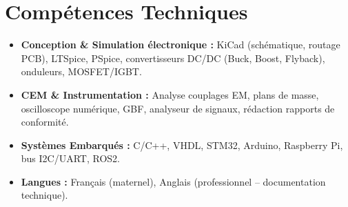 \documentclass[a4paper,11pt]{article}
\begin{document}
\vspace{2pt}

\section{Compétences Techniques}
\begin{itemize}[leftmargin=*, nosep]
    \item \small{\textbf{Conception \& Simulation électronique :} KiCad (schématique, routage PCB), LTSpice, PSpice, convertisseurs DC/DC (Buck, Boost, Flyback), onduleurs, MOSFET/IGBT.}
    \item \small{\textbf{CEM \& Instrumentation :} Analyse couplages EM, plans de masse, oscilloscope numérique, GBF, analyseur de signaux, rédaction rapports de conformité.}
    \item \small{\textbf{Systèmes Embarqués :} C/C++, VHDL, STM32, Arduino, Raspberry Pi, bus I2C/UART, ROS2.}
    \item \small{\textbf{Langues :} Français (maternel), Anglais (professionnel -- documentation technique).}
\end{itemize}

\vspace{2pt}

\end{document}
